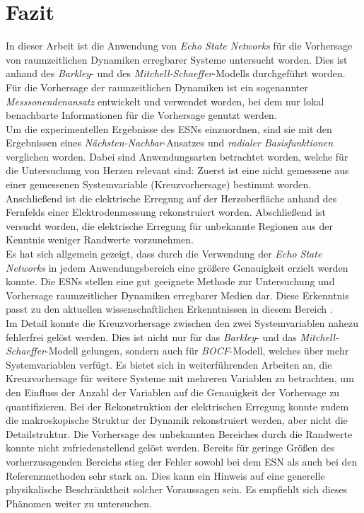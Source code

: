 \chapter{Fazit}
In dieser Arbeit ist die Anwendung von \textit{Echo State Networks} für die Vorhersage von raumzeitlichen Dynamiken erregbarer Systeme untersucht worden. Dies ist anhand des \textit{Barkley}- und des \textit{Mitchell-Schaeffer}-Modells durchgeführt worden. Für die Vorhersage der raumzeitlichen Dynamiken ist ein sogenannter \textit{Messsonendenansatz} entwickelt und verwendet worden, bei dem nur lokal benachbarte Informationen für die Vorhersage genutzt werden.\\

Um die experimentellen Ergebnisse des \textsc{ESN}s einzuordnen, sind sie mit den Ergebnissen eines \textit{Nächsten-Nachbar}-Ansatzes und \textit{radialer Basisfunktionen} verglichen worden. Dabei sind Anwendungsarten betrachtet worden, welche für die Untersuchung von Herzen relevant sind: Zuerst ist eine nicht gemessene aus einer gemessenen Systemvariable (Kreuzvorhersage) bestimmt worden. Anschließend ist die elektrische Erregung auf der Herzoberfläche anhand des Fernfelds einer Elektrodenmessung rekonstruiert worden. Abschließend ist versucht worden, die elektrische Erregung für unbekannte Regionen aus der Kenntnis weniger Randwerte vorzunehmen.\\

Es hat sich allgemein gezeigt, dass durch die Verwendung der \textit{Echo State Networks} in jedem Anwendungsbereich eine größere Genauigkeit erzielt werden konnte. Die \textsc{ESN}s stellen eine gut geeignete Methode zur Untersuchung und Vorhersage raumzeitlicher Dynamiken erregbarer Medien dar. Diese Erkenntnis passt zu den aktuellen wissenschaftlichen Erkenntnissen in diesem Bereich \citep{Lu2017}.\\

Im Detail konnte die Kreuzvorhersage zwischen den zwei Systemvariablen nahezu fehlerfrei gelöst werden. Dies ist nicht nur für das \textit{Barkley}- und das \textit{Mitchell-Schaeffer}-Modell gelungen, sondern auch für \textit{BOCF}-Modell, welches über mehr Systemvariablen verfügt. Es bietet sich in weiterführenden Arbeiten an, die Kreuzvorhersage für weitere Systeme mit mehreren Variablen zu betrachten, um den Einfluss der Anzahl der Variablen auf die Genauigkeit der Vorhersage zu quantifizieren. Bei der Rekonstruktion der elektrischen Erregung konnte zudem die makroskopische Struktur der Dynamik rekonstruiert werden, aber nicht die Detailstruktur. Die Vorhersage des unbekannten Bereiches durch die Randwerte konnte nicht zufriedenstellend gelöst werden. Bereits für geringe Größen des vorherzusagenden Bereichs stieg der Fehler sowohl bei dem \textsc{ESN} als auch bei den Referenzmethoden sehr stark an. Dies kann ein Hinweis auf eine generelle physikalische Beschränktheit solcher Voraussagen sein. Es empfiehlt sich dieses Phänomen weiter zu untersuchen. \\

